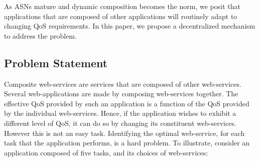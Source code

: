\documentclass[10pt,journal,compsoc]{IEEEtran}
\begin{document}
As ASNs mature and dynamic composition becomes the norm, we posit that applications that are composed of other applications will routinely adapt to changing QoS requirements. In this paper, we propose a decentralized mechanism to address the problem.  
\subsection{Problem Statement}
Composite web-services are services that are composed of other web-services. Several web-applications are made by composing web-services together. The effective QoS provided by such an application is a function of the QoS provided by the individual web-services. Hence, if the application wishes to exhibit a different level of QoS, it can do so by changing its constituent web-services. However this is not an easy task. Identifying the optimal web-service, for each task that the application performs, is a hard problem. To illustrate, consider an application composed of five tasks, and its choices of web-services:
\end{document}

